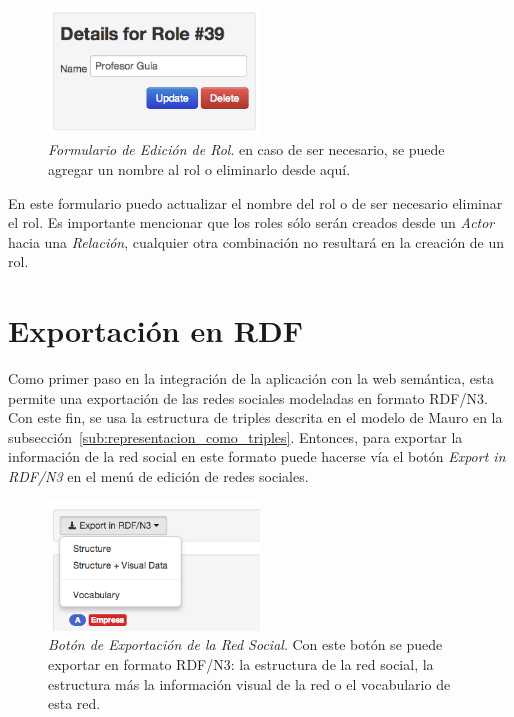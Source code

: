 \begin{figure}[H]
  \centering
  \includegraphics[width=0.5\textwidth]{images/edicion_rol.png}
  \caption[Formulario de Edición de Rol]{\emph{Formulario de Edición de Rol}. en caso de ser necesario, se puede agregar un nombre al rol o eliminarlo desde aquí.}
  \label{edicion_rol}
\end{figure}

En este formulario puedo actualizar el nombre del rol o de ser necesario eliminar el rol. Es importante mencionar que los roles sólo serán creados desde un \emph{Actor} hacia una \emph{Relación}, cualquier otra combinación no resultará en la creación de un rol.



\section{Exportación en RDF} %
\label{sec:exportacion_en_rdf}

Como primer paso en la integración de la aplicación con la web semántica, esta permite una exportación de las redes sociales modeladas en formato RDF/N3. Con este fin, se usa la estructura de triples descrita en el modelo de Mauro en la subsección~\ref{sub:representacion_como_triples}. Entonces, para exportar la información de la red social en este formato puede hacerse vía el botón \emph{Export in RDF/N3} en el menú de edición de redes sociales.\\

\begin{figure}[H]
  \centering
  \includegraphics[width=0.5\textwidth]{images/export_button.png}
  \caption[Botón de Exportación de la Red Social]{\emph{Botón de Exportación de la Red Social}. Con este botón se puede exportar en formato RDF/N3: la estructura de la red social, la estructura más la información visual de la red o el vocabulario de esta red.}
  \label{export_button}
\end{figure}

